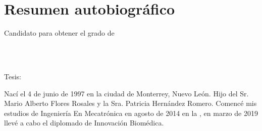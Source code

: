 
\chapter*{Resumen autobiográfico}
\thispagestyle{empty}

\begin{center}
\autor

Candidato para obtener el grado de\\
\grado\\
\orientacion\bigskip

\uanl\\
\fime\bigskip

Tesis:\\
\textsc{\large\titulo}
\end{center}\bigskip

Nací el 4 de junio de 1997 en la ciudad de Monterrey, Nuevo León. Hijo del Sr. Mario Alberto Flores Rosales y la Sra. Patricia Hernández Romero. Comencé mis estudios de Ingeniería En Mecatrónica en agosto de 2014 en la \uanl, en marzo de 2019 llevé a cabo el diplomado de Innovación Biomédica.
